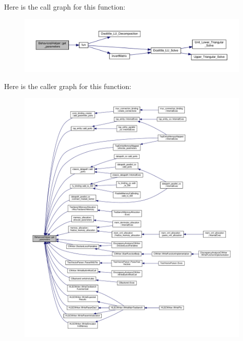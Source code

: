 Here is the call graph for this function\+:
\nopagebreak
\begin{figure}[H]
\begin{center}
\leavevmode
\includegraphics[width=350pt]{dd/db2/classBehavioralHelper_a610334c66bf0ac0813878674181ae8ce_cgraph}
\end{center}
\end{figure}
Here is the caller graph for this function\+:
\nopagebreak
\begin{figure}[H]
\begin{center}
\leavevmode
\includegraphics[width=350pt]{dd/db2/classBehavioralHelper_a610334c66bf0ac0813878674181ae8ce_icgraph}
\end{center}
\end{figure}
\mbox{\label{classBehavioralHelper_a19d53544a2afa3c307cb84725748d54c}} 
